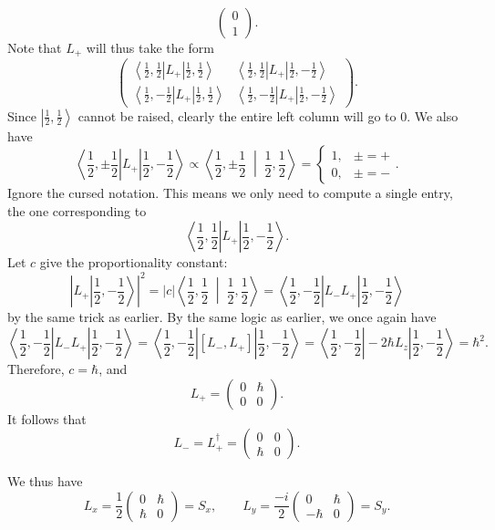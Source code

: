 \documentclass[11pt, letterpaper]{article}
\renewcommand{\ket}[1]{\left\vert #1 \right\rangle}
\renewcommand{\bra}[1]{\left\langle #1 \right\vert}
\renewcommand{\braket}[2]{\left\langle #1 \;\middle\vert\; #2 \right\rangle}
\begin{document}
\begin{enumerate}
\[\begin{pmatrix}
			0 \\
			1
			\end{pmatrix}
		.\]
		Note that $L_+$ will thus take the form
		\[
			\begin{pmatrix}
			\bra{\frac{1}{2} ,\frac{1}{2} } L_+\ket{\frac{1}{2} ,\frac{1}{2} }  & \bra{\frac{1}{2} ,\frac{1}{2} } L_+\ket{\frac{1}{2} ,-\frac{1}{2} }  \\
			\bra{\frac{1}{2} ,-\frac{1}{2} } L_+\ket{\frac{1}{2} ,\frac{1}{2} }  & \bra{\frac{1}{2} ,-\frac{1}{2} } L_+\ket{\frac{1}{2} ,-\frac{1}{2} } 
			\end{pmatrix}
		.\]
		Since $\ket{\frac{1}{2} ,\frac{1}{2} } $ cannot be raised, clearly the entire left column will go to 0. We also have
		\[
			\bra{\frac{1}{2} ,\pm\frac{1}{2} } L_+\ket{\frac{1}{2} ,-\frac{1}{2} } \propto \braket{\frac{1}{2} ,\pm \frac{1}{2} }{\frac{1}{2} ,\frac{1}{2} } =
			\begin{cases}
				1,&\pm = +\\
				0,&\pm =-
			\end{cases}
		.\]
		Ignore the cursed notation. This means we only need to compute a single entry, the one corresponding to
		\[
			\bra{\frac{1}{2} ,\frac{1}{2} } L_+\ket{\frac{1}{2} ,-\frac{1}{2} } 
		.\]
		Let $c$ give the proportionality constant:
		\[
			\left| L_+\ket{\frac{1}{2} ,-\frac{1}{2} }  \right| ^2=\left| c \right| \braket{\frac{1}{2} ,\frac{1}{2} }{\frac{1}{2} ,\frac{1}{2} } =\bra{\frac{1}{2} ,-\frac{1}{2} } L_-L_+\ket{\frac{1}{2} ,-\frac{1}{2} } 
		\]
		by the same trick as earlier. By the same logic as earlier, we once again have
		\[
			\bra{\frac{1}{2} ,-\frac{1}{2} } L_-L_+\ket{\frac{1}{2} ,-\frac{1}{2} } =\bra{\frac{1}{2} ,-\frac{1}{2} } \left[ L_-,L_+ \right] \ket{\frac{1}{2} ,-\frac{1}{2} } =\bra{\frac{1}{2} ,-\frac{1}{2} } -2\hbar L_z \ket{\frac{1}{2} ,-\frac{1}{2} } =\hbar ^2
		.\]
		Therefore, $c=\hbar $, and
		\[
			L_+=\begin{pmatrix}
			0 & \hbar  \\
			0 & 0
			\end{pmatrix}
		.\]
		It follows that
		\[
			L_-=L_+^{\dagger} =\begin{pmatrix}
			0 & 0 \\
			\hbar & 0
			\end{pmatrix}
		.\]

		We thus have
		\[
			L_x=\frac{1}{2} \begin{pmatrix}
			0 & \hbar  \\
			\hbar  & 0
			\end{pmatrix}=S_x,\qquad L_y = \frac{-i}{2} \begin{pmatrix}
			0 & \hbar  \\
			-\hbar  & 0
			\end{pmatrix}=S_y
		.\]
\end{enumerate}
\end{document}
